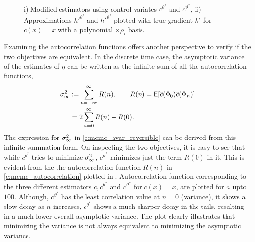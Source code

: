 \begin{figure}[htbp]
	\centering
	\mbox{
		 \quad
	}
	\caption{i) Modified estimators using control variates $c^{\theta^*}$ and $c^{\vartheta^*}$, ii) Approximations $h'^{\theta^*}$ and $h'^{\vartheta^*}$ plotted with true gradient $h'$ for $c(x) =x$ with a polynomial $\times \rho_i$ basis.}
	\label{fig:mcmc_cv_theta_var}
\end{figure}


Examining the autocorrelation functions offers another perspective to verify if the two objectives are equivalent. In the discrete time case, the asymptotic variance of the estimates of $\eta$ can be written as the infinite sum of all the autocorrelation functions,
\begin{equation}
\begin{aligned}
\asymvar  & \eqdef \sum_{n=-\infty}^\infty R(n), \qquad R(n) = \Expect [\tilc(\markovstate_0) \tilc(\markovstate_n)] \\
& = 2 \sum_{n=0}^\infty R(n)- R(0).
\end{aligned}
\label{e:mcmc_autocorrelation}
\end{equation}
The expression for $\sigma^2_\infty$ in \eqref{e:mcmc_avar_reversible} can be derived from this infinite summation form. On inspecting the two objectives, it is easy to see that while $c^{\theta^*}$ tries to minimize $\sigma^2_\infty$, $c^{\vartheta^*}$ minimizes just the term $R(0)$ in it. This is evident from the the autocorrelation function $R(n)$ in \eqref{e:mcmc_autocorrelation} plotted in . Autocorrelation function corresponding to the three different estimators $c,c^{\theta^*}$  and $c^{\vartheta^*}$ for $c(x) = x$, are plotted for $n$ upto $100$. Although, $c^{\vartheta^{*}}$ has the least correlation value at $n=0$ (variance), it shows a slow decay as $n$ increases, $c^{\theta^*}$ shows a much sharper decay in the tails, resulting in a much lower overall asymptotic variance. The plot clearly illustrates that minimizing the variance is not always equivalent to minimizing the asymptotic variance.

